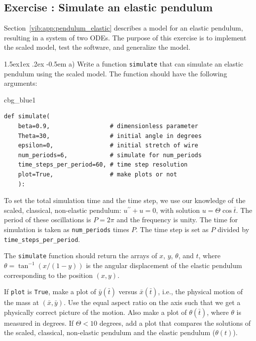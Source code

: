 \documentclass[%
oneside,                 %
final,                   %
10pt]{article}
\makeatletter
\newenvironment{_cod_tight}[1]{
   \def\FrameCommand{\colorbox{#1}}
   \FrameRule0.6pt\MakeFramed {\FrameRestore}\vskip3mm}
   {\vskip0mm\endMakeFramed}
\newenvironment{cod}[1]{
\bgroup\rmfamily
\fboxsep=0mm\relax
\begin{_cod_tight}{#1}
\list{}{\parsep=-2mm\parskip=0mm\topsep=0pt\leftmargin=2mm
\rightmargin=2\leftmargin\leftmargin=4pt\relax}
\item\relax}
{\endlist\end{_cod_tight}\egroup}
\newenvironment{doconceexercise}{}{}
\newcounter{doconceexercisecounter}
\newcommand\subex{\@startsection{paragraph}{4}{\z@}%
                  {1.5ex\@plus1ex \@minus.2ex}%
                  {-0.5em}%
                  {\normalfont\normalsize\bfseries}}
\makeatother
\begin{document}
\begin{doconceexercise}

\subsection*{Exercise \thedoconceexercisecounter: Simulate an elastic pendulum}

\label{vib:exer:pendulum_elastic}

Section~\ref{vib:app:pendulum_elastic} describes a model for an elastic
pendulum, resulting in a system of two ODEs. The purpose of this
exercise is to implement the scaled model, test the software, and
generalize the model.


\subex{a)}
Write a function \texttt{simulate}
that can simulate an elastic pendulum using the scaled model.
The function should have the following arguments:

\begin{cod}{cbg_blue1}\begin{Verbatim}[numbers=none,fontsize=\fontsize{9pt}{9pt},baselinestretch=0.95,xleftmargin=2mm]
def simulate(
    beta=0.9,                 # dimensionless parameter
    Theta=30,                 # initial angle in degrees
    epsilon=0,                # initial stretch of wire
    num_periods=6,            # simulate for num_periods
    time_steps_per_period=60, # time step resolution
    plot=True,                # make plots or not
    ):
\end{Verbatim}
\end{cod}
\noindent
To set the total simulation time and the time step, we
use our knowledge of the scaled, classical, non-elastic pendulum:
$u^{\prime\prime} + u = 0$, with solution
$u = \Theta\cos \bar t$.
The period of these oscillations is $P=2\pi$
and the frequency is unity. The time
for simulation is taken as \Verb!num_periods! times $P$. The time step
is set as $P$ divided by \Verb!time_steps_per_period!.

The \texttt{simulate} function should return the arrays of
$x$, $y$, $\theta$, and $t$, where $\theta = \tan^{-1}(x/(1-y))$ is
the angular displacement of the elastic pendulum corresponding to the
position $(x,y)$.

If \texttt{plot} is \texttt{True}, make a plot of $\bar y(\bar t)$
versus $\bar x(\bar t)$, i.e., the physical motion
of the mass at $(\bar x,\bar y)$. Use the equal aspect ratio on the axis
such that we get a physically correct picture of the motion. Also
make a plot of $\theta(\bar t)$, where $\theta$ is measured in degrees.
If $\Theta < 10$ degrees, add a plot that compares the solutions of
the scaled, classical, non-elastic pendulum and the elastic pendulum
($\theta(t)$).


\end{doconceexercise}
\end{document}
